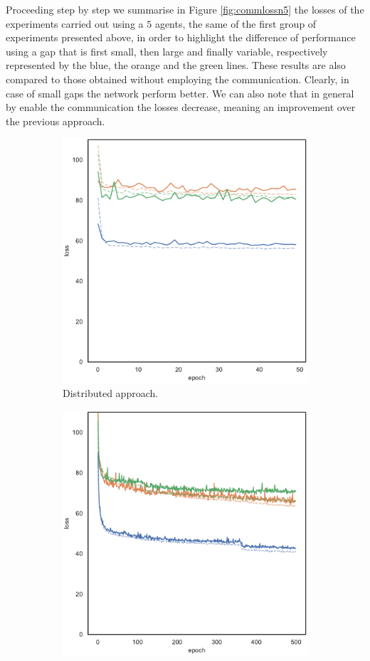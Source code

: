 Proceeding step by step we summarise in Figure \ref{fig:commlossn5} the losses 
of the experiments carried out using a $5$ agents, the same of the first group of 
experiments presented above, in order to highlight the difference of performance 
using a gap that is first small, then large and finally variable, respectively 
represented by the blue, the orange and the green lines.
These results are also compared to those obtained without employing the 
communication.
Clearly, in case of small gaps the network perform better. We can also note that in 
general by enable the communication the losses decrease, meaning an 
improvement over the previous approach.
\begin{figure}[!htb]
	\begin{center}
		\begin{subfigure}[h]{0.49\textwidth}
			\centering
			\includegraphics[width=.7\textwidth]{contents/images/task1-comm-extension/loss-distributed-N5@copy}
			\caption{Distributed approach.}
		\end{subfigure}
		\hfill
		\begin{subfigure}[h]{0.49\textwidth}
			\centering
			\includegraphics[width=.7\textwidth]{contents/images/task1-comm-extension/loss-communication-N5@copy}

\end{subfigure}
\end{center}
\end{figure}
